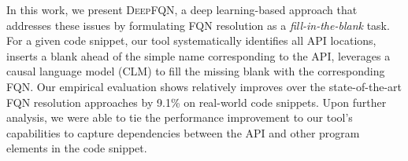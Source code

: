 \documentclass[conference]{IEEEtran}
\newcommand{\tool}{\textsc{DeepFQN}\xspace}
\begin{document}







%

%











%







In this work, we present {\tool}, a deep learning-based approach that
addresses these issues by formulating FQN resolution as a
\textit{fill-in-the-blank} task. For a given code snippet, our tool
systematically identifies all API locations, inserts a blank ahead of
the simple name corresponding to the API, leverages a causal language
model (CLM) to fill the missing blank with the corresponding FQN.  Our
empirical evaluation shows relatively improves over the
state-of-the-art FQN resolution approaches by 9.1\% on real-world code
snippets. Upon further analysis, we were able to tie the performance
improvement to our tool's capabilities to capture dependencies between
the API and other program elements in the code snippet.


\balance




\end{document}
